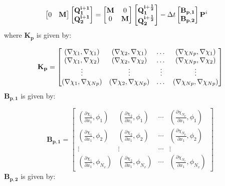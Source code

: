 \begin{equation}
\begin{aligned}
\begin{bmatrix}
		0 & \mathbf{M}
	\end{bmatrix} \begin{bmatrix}
		\mathbf{Q^{i+1}_1} \\
		\mathbf{Q^{i+1}_2}
	\end{bmatrix} &=	\begin{bmatrix}
		\mathbf{M} & 0 \\
		0 & \mathbf{M}
	\end{bmatrix} \begin{bmatrix}
		\mathbf{Q^{i+\frac{1}{2}}_1} \\
		\mathbf{Q^{i+\frac{1}{2}}_2}
	\end{bmatrix} - \Delta t \begin{bmatrix}
		\mathbf{B_{p,1}} \\
		\mathbf{B_{p,2}}
	\end{bmatrix} \mathbf{P}^i
\end{aligned}\label{eq:chorin_split_fem}
\end{equation}
where $\mathbf{K_p}$ is given by:

\begin{equation*}
	\mathbf{K_p} = \begin{bmatrix}
		\left(\nabla\chi_1, \nabla\chi_1\right) & \left(\nabla\chi_2, \nabla\chi_1\right) & \dots & \left(\nabla\chi_{Np}, \nabla\chi_1\right)\\
		\left(\nabla\chi_1, \nabla\chi_2\right) & \left(\nabla\chi_2, \nabla\chi_2\right) & \dots & \left(\nabla\chi_{Np}, \nabla\chi_2\right)\\
		\vdots & \vdots & \vdots & \vdots\\
		\left(\nabla\chi_1, \nabla\chi_{Np}\right) & \left(\nabla\chi_2, \nabla\chi_{Np}\right) & \dots & \left(\nabla\chi_{Np}, \nabla\chi_{Np}\right)
	\end{bmatrix}
\end{equation*}
$\mathbf{B_{p,1}}$ is given by:

\begin{equation*}
	\mathbf{B_{p,1}} = \begin{bmatrix}
		\left(\frac{\partial\chi_1}{\partial x_1}, \phi_1\right) & \left(\frac{\partial\chi_2}{\partial x_1}, \phi_1\right) & \cdots & \left(\frac{\partial\chi_{N_p}}{\partial x_1}, \phi_1\right) \\
		\left(\frac{\partial\chi_1}{\partial x_1}, \phi_2\right) & \left(\frac{\partial\chi_2}{\partial x_1}, \phi_2\right) & \cdots & \left(\frac{\partial\chi_{N_p}}{\partial x_1}, \phi_2\right) \\
		\vdots & \vdots & \cdots & \vdots \\
		\left(\frac{\partial\chi_1}{\partial x_1}, \phi_{N_v}\right) & \left(\frac{\partial\chi_2}{\partial x_1}, \phi_{N_v}\right) & \cdots & \left(\frac{\partial\chi_{N_v}}{\partial x_1}, \phi_{N_v}\right)
	\end{bmatrix}
\end{equation*}
$\mathbf{B_{p,2}}$ is given by:

